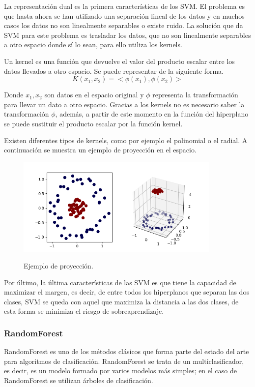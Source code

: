 La representación dual es la primera características de los SVM. El problema es que hasta ahora se han utilizado una separación lineal de los datos y en muchos casos los datos no son linealmente separables o existe ruido. La solución que da SVM para este problema es trasladar los datos, que no son linealmente separables a otro espacio donde sí lo sean, para ello utiliza los kernels.\newline

Un kernel es una función que devuelve el valor del producto escalar entre los datos llevados a otro espacio. Se puede representar de la siguiente forma.
$$ K(x_1,x_2) = <\phi(x_1), \phi(x_2)> $$

Donde $x_1, x_2$ son datos en el espacio original y $\phi$ representa la transformación para llevar un dato a otro espacio. Gracias a los kernels no es necesario saber la transformación $\phi$, además, a partir de este momento en la función del hiperplano se puede sustituir el producto escalar por la función kernel.\newline

Existen diferentes tipos de kernels, como por ejemplo el polinomial o el radial. A continuación se muestra un ejemplo de proyección en el espacio.\newline

\begin{figure}[h]
	\centering
	\includegraphics[width=100mm]{imagenes/svm_kernel_example.png}
	\label{fig:215}
	\caption{Ejemplo de proyección.}
\end{figure}
\newpage
Por último, la última características de las SVM es que tiene la capacidad
de maximizar el margen, es decir, de entre todos los hiperplanos que separan las dos clases, SVM se queda con aquel que maximiza la distancia a las dos clases, de esta forma se minimiza el riesgo de sobreaprendizaje.\newline

\subsubsection{RandomForest}
RandomForest es uno de los métodos clásicos que forma parte del estado del arte para algoritmos de clasificación. RandomForest se trata de un multiclasificador, es decir, es un modelo formado por varios modelos más simples; en el caso de RandomForest se utilizan árboles de clasificación.\newline

